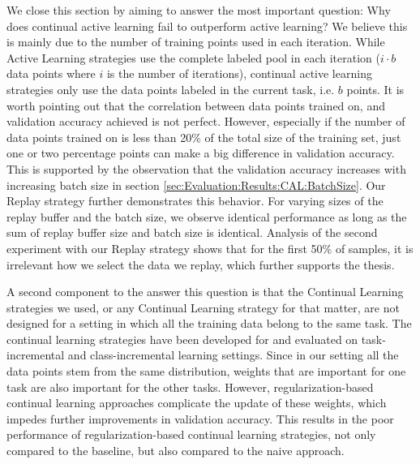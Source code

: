 We close this section by aiming to answer the most important question: Why does continual active learning fail to outperform active learning? We believe this is mainly
due to the number of training points used in each iteration. While Active Learning strategies use the complete labeled pool in each iteration ($i \cdot b$ data
points where $i$ is the number of iterations), continual active learning strategies only use the data points labeled in the current task, i.e. $b$ points.
It is worth pointing out that the correlation between data points trained on, and validation accuracy achieved is not perfect. However, especially if the
number of data points trained on is less than 20\% of the total size of the training set, just one or two percentage points can make a big difference in validation
accuracy. This is supported by the observation that the validation accuracy increases with increasing batch size in section \ref{sec:Evaluation:Results:CAL:BatchSize}.
Our Replay strategy further demonstrates this behavior. For varying sizes of the replay buffer and the batch size, we observe identical performance as long as the sum
of replay buffer size and batch size is identical. Analysis of the second experiment with our Replay strategy shows that for the first 50\% of samples, it is irrelevant
how we select the data we replay, which further supports the thesis. \par
A second component to the answer this question is that the Continual Learning strategies we used, or any Continual Learning strategy for that matter, are not
designed for a setting in which all the training data belong to the same task. The continual learning strategies have been developed for and evaluated on task-incremental
and class-incremental learning settings. Since in our setting all the data points stem from the same distribution, weights that are important for one task are also
important for the other tasks. However, regularization-based continual learning approaches complicate the update of these weights, which impedes further improvements
in validation accuracy. This results in the poor performance of regularization-based continual learning strategies, not only compared to the baseline, but also compared
to the naive approach. 



